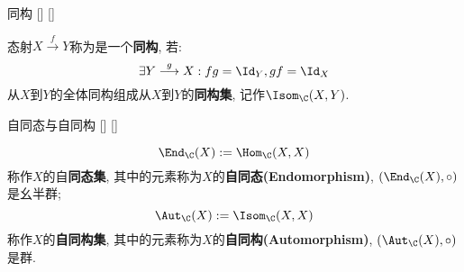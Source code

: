 \documentclass[UTF8]{ctexart}
\begin{document}
    \begin{dfn}
        []
        {同构}
        []
        []


        态射$X\overset{f}{\longrightarrow}Y$称为是一个\textbf{同构}, 若: 
        \[\exists Y\overset{g}{\longrightarrow}X: fg=\Id_Y, gf=\Id_X\]
        从$X$到$Y$的全体同构组成从$X$到$Y$的\textbf{同构集}, 记作$\Isom_{\C}(X,Y)$. 
    \end{dfn}
    
    \begin{dfn}
        []
        {自同态与自同构}
        []
        []

        \[\End_{\C}(X):=\Hom_{\C}(X,X)\]
        称作$X$的自\textbf{同态集}, 其中的元素称为$X$的\textbf{自同态(Endomorphism)}, $(\End_{\C}(X),\circ)$是幺半群; 
        \[\Aut_{\C}(X):=\Isom_{\C}(X,X)\]
        称作$X$的\textbf{自同构集}, 其中的元素称为$X$的\textbf{自同构(Automorphism)}, $(\Aut_{\C}(X),\circ)$是群. 
    \end{dfn}
\end{document}
